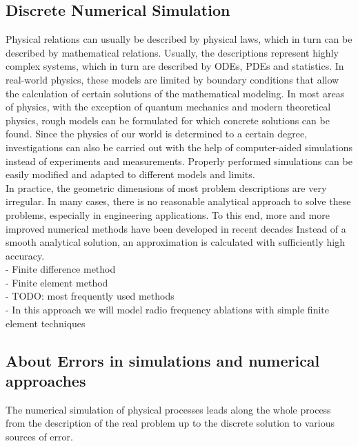\documentclass[parskip=half, titlepage=yes, 12pt, BCOR=12mm, DIV=calc]{scrartcl}
\begin{document}
\subsection{Discrete Numerical Simulation}
Physical relations can usually be described by physical laws, which in turn can be described by mathematical relations. 
Usually, the descriptions represent highly complex systems, which in turn are described by ODEs, PDEs and statistics.
In real-world physics, these models are limited by boundary conditions that allow the calculation of certain solutions of the mathematical modeling. 
In most areas of physics, with the exception of quantum mechanics and modern theoretical physics, rough models can be formulated for which concrete solutions can be found. 
Since the physics of our world is determined to a certain degree, investigations can also be carried out with the help of computer-aided simulations instead of experiments and measurements. 
Properly performed simulations can be easily modified and adapted to different models and limits. \\

In practice, the geometric dimensions of most problem descriptions are very irregular.
In many cases, there is no reasonable analytical approach to solve these problems, especially in engineering applications.
To this end, more and more improved numerical methods have been developed in recent decades 
Instead of a smooth analytical solution, an approximation is calculated with sufficiently high accuracy.\\

- Finite difference method \\
- Finite element method \\
- TODO: most frequently used methods \\
- In this approach we will model radio frequency ablations with simple finite element techniques \\




\subsection{About Errors in simulations and numerical approaches}

The numerical simulation of physical processes leads along the whole process from the description of the real problem up to the discrete solution to various sources of error.
\end{document}
